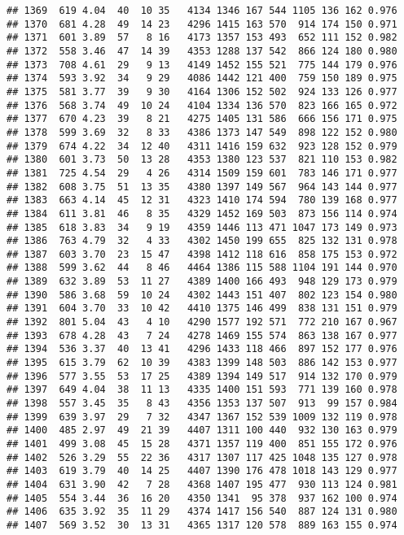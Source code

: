 \documentclass[]{article}
\begin{document}
\begin{verbatim}
## 1369  619 4.04  40  10 35   4134 1346 167 544 1105 136 162 0.976
## 1370  681 4.28  49  14 23   4296 1415 163 570  914 174 150 0.971
## 1371  601 3.89  57   8 16   4173 1357 153 493  652 111 152 0.982
## 1372  558 3.46  47  14 39   4353 1288 137 542  866 124 180 0.980
## 1373  708 4.61  29   9 13   4149 1452 155 521  775 144 179 0.976
## 1374  593 3.92  34   9 29   4086 1442 121 400  759 150 189 0.975
## 1375  581 3.77  39   9 30   4164 1306 152 502  924 133 126 0.977
## 1376  568 3.74  49  10 24   4104 1334 136 570  823 166 165 0.972
## 1377  670 4.23  39   8 21   4275 1405 131 586  666 156 171 0.975
## 1378  599 3.69  32   8 33   4386 1373 147 549  898 122 152 0.980
## 1379  674 4.22  34  12 40   4311 1416 159 632  923 128 152 0.979
## 1380  601 3.73  50  13 28   4353 1380 123 537  821 110 153 0.982
## 1381  725 4.54  29   4 26   4314 1509 159 601  783 146 171 0.977
## 1382  608 3.75  51  13 35   4380 1397 149 567  964 143 144 0.977
## 1383  663 4.14  45  12 31   4323 1410 174 594  780 139 168 0.977
## 1384  611 3.81  46   8 35   4329 1452 169 503  873 156 114 0.974
## 1385  618 3.83  34   9 19   4359 1446 113 471 1047 173 149 0.973
## 1386  763 4.79  32   4 33   4302 1450 199 655  825 132 131 0.978
## 1387  603 3.70  23  15 47   4398 1412 118 616  858 175 153 0.972
## 1388  599 3.62  44   8 46   4464 1386 115 588 1104 191 144 0.970
## 1389  632 3.89  53  11 27   4389 1400 166 493  948 129 173 0.979
## 1390  586 3.68  59  10 24   4302 1443 151 407  802 123 154 0.980
## 1391  604 3.70  33  10 42   4410 1375 146 499  838 131 151 0.979
## 1392  801 5.04  43   4 10   4290 1577 192 571  772 210 167 0.967
## 1393  678 4.28  43   7 24   4278 1469 155 574  863 138 167 0.977
## 1394  536 3.37  40  13 41   4296 1433 118 466  897 152 177 0.976
## 1395  615 3.79  62  10 39   4383 1399 148 503  886 142 153 0.977
## 1396  577 3.55  53  17 25   4389 1394 149 517  914 132 170 0.979
## 1397  649 4.04  38  11 13   4335 1400 151 593  771 139 160 0.978
## 1398  557 3.45  35   8 43   4356 1353 137 507  913  99 157 0.984
## 1399  639 3.97  29   7 32   4347 1367 152 539 1009 132 119 0.978
## 1400  485 2.97  49  21 39   4407 1311 100 440  932 130 163 0.979
## 1401  499 3.08  45  15 28   4371 1357 119 400  851 155 172 0.976
## 1402  526 3.29  55  22 36   4317 1307 117 425 1048 135 127 0.978
## 1403  619 3.79  40  14 25   4407 1390 176 478 1018 143 129 0.977
## 1404  631 3.90  42   7 28   4368 1407 195 477  930 113 124 0.981
## 1405  554 3.44  36  16 20   4350 1341  95 378  937 162 100 0.974
## 1406  635 3.92  35  11 29   4374 1417 156 540  887 124 131 0.980
## 1407  569 3.52  30  13 31   4365 1317 120 578  889 163 155 0.974

\end{verbatim}
\end{document}

